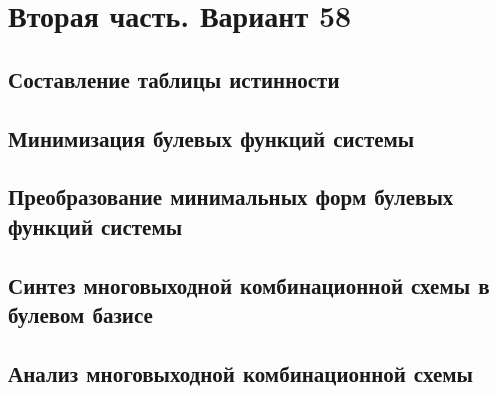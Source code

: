 \documentclass[a4paper, 11pt]{article}
\begin{document}
\section{Вторая часть. Вариант 58}

\subsection{Составление таблицы истинности}

\subsection{Минимизация булевых функций системы}


\subsection{Преобразование минимальных форм булевых функций системы}


\subsection{Синтез многовыходной комбинационной схемы в булевом базисе}


\subsection{Анализ многовыходной комбинационной схемы}

\end{document}
